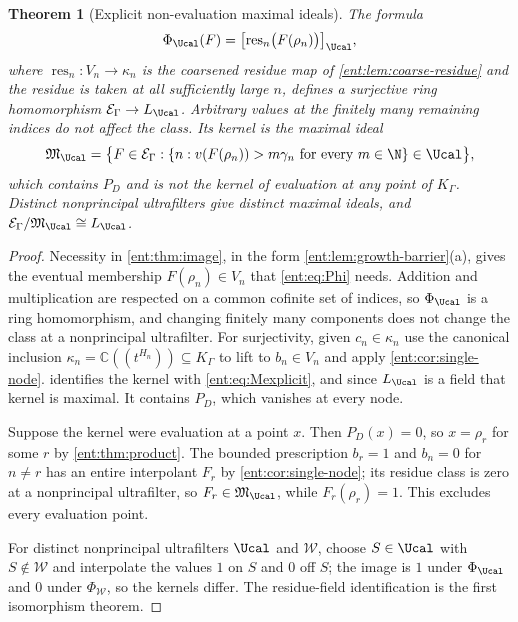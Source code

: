 \documentclass[11pt]{article}
\newtheorem{theorem}{Theorem}[section]
\theoremstyle{plain}
\theoremstyle{plain}
\theoremstyle{plain}
\theoremstyle{definition}
\theoremstyle{definition}
\theoremstyle{definition}
\theoremstyle{definition}
\theoremstyle{remark}
\newcommand{\C}{\mathbb C}\newcommand{\R}{\mathbb R}
\newcommand{\K}{K_\Gamma}\newcommand{\KD}{K_\Delta}
\newcommand{\E}{\mathcal E_\Gamma}
\newcommand{\res}{\operatorname{res}}
\begin{document}
\begin{theorem}[Explicit non-evaluation maximal ideals]\label{ent:thm:maximal}
The formula
\begin{equation}\label{ent:eq:Phi}
 \Phi_\Ucal(F)=\bigl[\res_n\bigl(F(\rho_n)\bigr)\bigr]_\Ucal ,
\end{equation}
where $\res_n:V_n\to\kappa_n$ is the coarsened residue map of
\cref{ent:lem:coarse-residue} and the residue is taken at all sufficiently
large $n$, defines a surjective ring homomorphism $\E\to L_\Ucal$. Arbitrary
values at the finitely many remaining indices do not affect the class. Its
kernel is the maximal ideal
\begin{equation}\label{ent:eq:Mexplicit}
 \mathfrak M_\Ucal=
 \bigl\{F\in\E:\{n:v(F(\rho_n))>m\gamma_n\text{ for every }m\in\N\}
 \in\Ucal\bigr\},
\end{equation}
which contains $P_D$ and is not the kernel of evaluation at any point of
$\K$. Distinct nonprincipal ultrafilters give distinct maximal ideals, and
$\E/\mathfrak M_\Ucal\cong L_\Ucal$.
\end{theorem}
\begin{proof}
Necessity in \cref{ent:thm:image}, in the form
\cref{ent:lem:growth-barrier}(a), gives the eventual membership
$F(\rho_n)\in V_n$ that \eqref{ent:eq:Phi} needs. Addition and multiplication
are respected on a common cofinite set of indices, so $\Phi_\Ucal$ is a ring
homomorphism, and changing finitely many components does not change the class
at a nonprincipal ultrafilter. For surjectivity, given $c_n\in\kappa_n$ use
the canonical inclusion $\kappa_n=\C((t^{H_n}))\subseteq\K$ to lift to
$b_n\in V_n$ and apply \cref{ent:cor:single-node}.
 identifies the kernel with
\eqref{ent:eq:Mexplicit}, and since $L_\Ucal$ is a field that kernel is
maximal. It contains $P_D$, which vanishes at every node.

Suppose the kernel were evaluation at a point $x$. Then $P_D(x)=0$, so
$x=\rho_r$ for some $r$ by \cref{ent:thm:product}. The bounded prescription
$b_r=1$ and $b_n=0$ for $n\ne r$ has an entire interpolant $F_r$ by
\cref{ent:cor:single-node}; its residue class is zero at a nonprincipal
ultrafilter, so $F_r\in\mathfrak M_\Ucal$, while $F_r(\rho_r)=1$. This
excludes every evaluation point.

For distinct nonprincipal ultrafilters $\Ucal$ and $\mathcal W$, choose
$S\in\Ucal$ with $S\notin\mathcal W$ and interpolate the values $1$ on $S$
and $0$ off $S$; the image is $1$ under $\Phi_\Ucal$ and $0$ under
$\Phi_\mathcal W$, so the kernels differ. The residue-field identification is
the first isomorphism theorem.
\end{proof}
\end{document}
